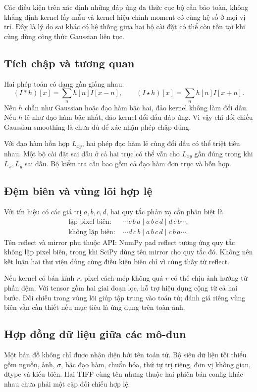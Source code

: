 Các điều kiện trên xác định những đáp ứng đa thức cục bộ cần bảo toàn, không khẳng định kernel lấy mẫu và kernel hiệu chỉnh moment có cùng hệ số ở mọi vị trí. Đây là lý do sai khác có hệ thống giữa hai bộ cài đặt có thể còn tồn tại khi cùng dùng công thức Gaussian liên tục.

\subsection{Tích chập và tương quan}
Hai phép toán có dạng gần giống nhau:
\begin{equation}
(I*h)[x]=\sum_n h[n]I[x-n],\qquad
(I\star h)[x]=\sum_n h[n]I[x+n].
\end{equation}
Nếu $h$ chẵn như Gaussian hoặc đạo hàm bậc hai, đảo kernel không làm đổi dấu. Nếu $h$ lẻ như đạo hàm bậc nhất, đảo kernel đổi dấu đáp ứng. Vì vậy chỉ đối chiếu Gaussian smoothing là chưa đủ để xác nhận phép chập đúng.

Với đạo hàm hỗn hợp $L_{xy}$, hai phép đạo hàm lẻ cùng đổi dấu có thể triệt tiêu nhau. Một bộ cài đặt sai dấu ở cả hai trục có thể vẫn cho $L_{xy}$ gần đúng trong khi $L_x,L_y$ sai dấu. Bộ kiểm tra cần bao gồm cả đạo hàm đơn trục và hỗn hợp.

\subsection{Đệm biên và vùng lõi hợp lệ}
Với tín hiệu có các giá trị $a,b,c,d$, hai quy tắc phản xạ cần phân biệt là
\begin{align*}
\text{lặp pixel biên: }&\cdots c\,b\,a\mid a\,b\,c\,d\mid d\,c\,b\cdots,\\
\text{không lặp biên: }&\cdots d\,c\,b\mid a\,b\,c\,d\mid c\,b\,a\cdots.
\end{align*}
Tên reflect và mirror phụ thuộc API: NumPy pad reflect tương ứng quy tắc không lặp pixel biên, trong khi SciPy dùng tên mirror cho quy tắc đó. Không nên kết luận hai thư viện dùng cùng điều kiện biên chỉ vì cùng thấy từ reflect.

Nếu kernel có bán kính $r$, pixel cách mép không quá $r$ có thể chịu ảnh hưởng từ phần đệm. Với tensor gồm hai giai đoạn lọc, hỗ trợ hiệu dụng cộng từ cả hai bước. Đối chiếu trong vùng lõi giúp tập trung vào toán tử; đánh giá riêng vùng biên vẫn cần thiết nếu mục tiêu là ứng dụng trên toàn ảnh.

\subsection{Hợp đồng dữ liệu giữa các mô-đun}
Một bản đồ không chỉ được nhận diện bởi tên toán tử. Bộ siêu dữ liệu tối thiểu gồm nguồn, ảnh, $\sigma$, bậc đạo hàm, chuẩn hóa, thứ tự trị riêng, đơn vị không gian, dtype và kiểu biên. Hai TIFF cùng tên nhưng thuộc hai phiên bản config khác nhau chưa phải một cặp đối chiếu hợp lệ.

